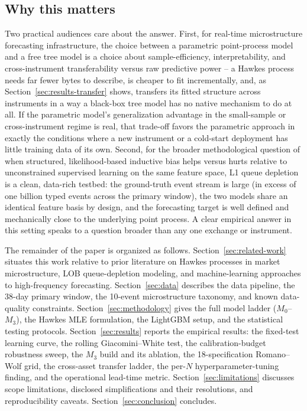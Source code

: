 \subsection{Why this matters}
\label{sec:intro-why}

Two practical audiences care about the answer. First, for real-time
microstructure forecasting infrastructure, the choice between a
parametric point-process model and a free tree model is a choice about
sample-efficiency, interpretability, and cross-instrument transferability
versus raw predictive power -- a Hawkes process needs far fewer bytes to
describe, is cheaper to fit incrementally, and, as
Section~\ref{sec:results-transfer} shows, transfers its fitted structure
across instruments in a way a black-box tree model has no native
mechanism to do at all. If the parametric model's generalization
advantage in the small-sample or cross-instrument regime is real, that
trade-off favors the parametric approach in exactly the conditions where
a new instrument or a cold-start deployment has little training data of
its own. Second, for the broader methodological question of when
structured, likelihood-based inductive bias helps versus hurts relative
to unconstrained supervised learning on the same feature space, L1 queue
depletion is a clean, data-rich testbed: the ground-truth event stream is
large (in excess of one billion typed events across the primary window),
the two models share an identical feature basis by design, and the
forecasting target is well defined and mechanically close to the
underlying point process. A clear empirical answer in this setting speaks
to a question broader than any one exchange or instrument.

The remainder of the paper is organized as follows.
Section~\ref{sec:related-work} situates this work relative to prior
literature on Hawkes processes in market microstructure, LOB
queue-depletion modeling, and machine-learning approaches to
high-frequency forecasting. Section~\ref{sec:data} describes the data
pipeline, the 38-day primary window, the 10-event microstructure
taxonomy, and known data-quality constraints. Section~\ref{sec:methodology}
gives the full model ladder ($M_0$--$M_3$), the Hawkes MLE formulation,
the LightGBM setup, and the statistical testing protocols.
Section~\ref{sec:results} reports the empirical results: the fixed-test
learning curve, the rolling Giacomini--White test, the calibration-budget
robustness sweep, the $M_3$ build and its ablation, the 18-specification
Romano--Wolf grid, the cross-asset transfer ladder, the per-$N$
hyperparameter-tuning finding, and the operational lead-time metric.
Section~\ref{sec:limitations} discusses scope limitations, disclosed
simplifications and their resolutions, and reproducibility caveats.
Section~\ref{sec:conclusion} concludes.

